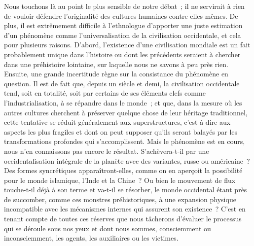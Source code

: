 \documentclass[french,twoside]{book} %
\begin{document}
Nous touchons là au point le plus sensible de notre débat ; il ne servirait à rien de vouloir défendre l’originalité des cultures humaines contre elles-mêmes. De plus, il est extrêmement difficile à l’ethnologue d’apporter une juste estimation d’un phénomène comme l’universalisation de la civilisation occidentale, et cela pour plusieurs raisons. D’abord, l’existence d’une civilisation mondiale est un fait probablement unique dans l’histoire ou dont les précédents seraient à chercher dans une préhistoire lointaine, sur laquelle nous ne savons à peu près rien. Ensuite, une grande incertitude règne sur la consistance du phénomène en question. Il est de fait que, depuis un siècle et demi, la civilisation occidentale tend, soit en totalité, soit par certains de ses éléments clefs comme l’industrialisation, à se répandre dans le monde ; et que, dans la mesure où les autres cultures cherchent à préserver quelque chose de leur héritage traditionnel, cette tentative se réduit généralement aux superstructures, c’est-à-dire aux aspects les plus fragiles et dont on peut supposer qu’ils seront balayés par les transformations profondes qui s’accomplissent. Mais le phénomène est en cours, nous n’en connaissons pas encore le résultat. S’achèvera-t-il par une occidentalisation intégrale de la planète avec des variantes, russe ou américaine ? Des formes syncrétiques apparaîtront-elles, comme on en aperçoit la possibilité pour le monde islamique, l’Inde et la Chine ? Ou bien le mouvement de flux touche-t-il déjà à son terme et va-t-il se résorber, le monde occidental étant près de succomber, comme ces monstres préhistoriques, à une expansion physique incompatible avec les mécanismes internes qui assurent son existence ? C’est en tenant compte de toutes ces réserves que nous tâcherons d’évaluer le processus qui se déroule sous nos yeux et dont nous sommes, consciemment ou inconsciemment, les agents, les auxiliaires ou les victimes.\par
\end{document}
